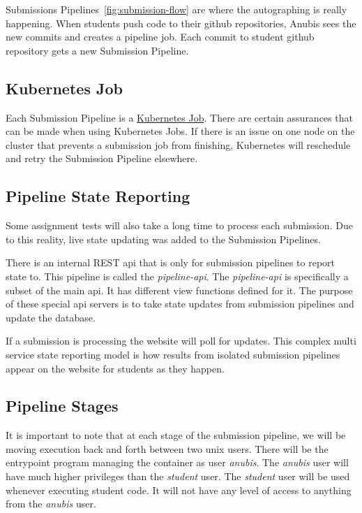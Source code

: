 Submissions Pipelines~\ref{fig:submission-flow} are where the autographing is really happening.
When students push code to their github repositories, Anubis sees the new
commits and creates a pipeline job.
Each commit to student github repository gets a new Submission Pipeline.

\subsection{Kubernetes Job}

Each Submission Pipeline is a \href{https://kubernetes.io/docs/concepts/workloads/controllers/job/}{Kubernetes Job}.
There are certain assurances that can be made when using Kubernetes Jobs.
If there is an issue on one node on the cluster that prevents a submission job from finishing,
Kubernetes will reschedule and retry the Submission Pipeline elsewhere.

\subsection{Pipeline State Reporting}

Some assignment tests will also take a long time to process each submission.
Due to this reality, live state updating was added to the Submission Pipelines.

There is an internal REST api that is only for submission pipelines to report state to.
This pipeline is called the \textit{pipeline-api}.
The \textit{pipeline-api} is specifically a subset of the main api.
It has different view functions defined for it.
The purpose of these special api servers is to take state updates from submission
pipelines and update the database.

If a submission is processing the website will poll for updates.
This complex multi service state reporting model is how results from isolated
submission pipelines appear on the website for students as they happen.

\subsection{Pipeline Stages}

It is important to note that at each stage of the submission pipeline,
we will be moving execution back and forth between two unix users.
There will be the entrypoint program managing the container as user \textit{anubis}.
The \textit{anubis} user will have much higher privileges than the \textit{student} user.
The \textit{student} user will be used whenever executing student code.
It will not have any level of access to anything from the \textit{anubis} user.

